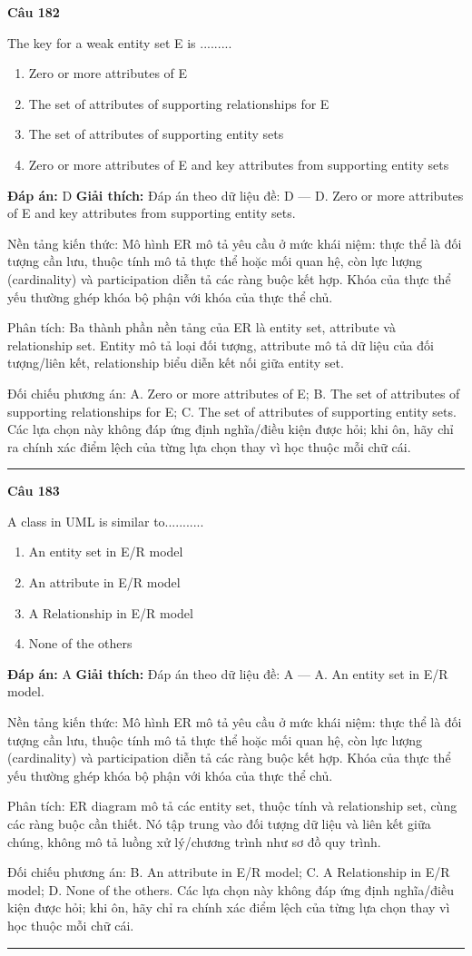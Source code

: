 \documentclass[11pt,a4paper]{article}
\newenvironment{question}[1]{%
  \par\vspace{1em}\noindent\textbf{\large Câu #1}\par\vspace{0.4em}
}{%
  \par\vspace{1em}\hrule\vspace{0.6em}
}
\newenvironment{choices}{%
  \begin{enumerate}[label=\textbf{\Alph*.},leftmargin=2.2em,itemsep=2pt,topsep=3pt]
}{%
  \end{enumerate}
}
\newcommand{\choice}{\item}
\begin{document}
\begin{question}{182}
The key for a weak entity set E is .........
\begin{choices}
\choice Zero or more attributes of E
\choice The set of attributes of supporting relationships for E
\choice The set of attributes of supporting entity sets
\choice Zero or more attributes of E and key attributes from supporting entity sets
\end{choices}
\textbf{Đáp án:} D
\textbf{Giải thích:} Đáp án theo dữ liệu đề: D — D. Zero or more attributes of E and key attributes from supporting entity sets.

Nền tảng kiến thức: Mô hình ER mô tả yêu cầu ở mức khái niệm: thực thể là đối tượng cần lưu, thuộc tính mô tả thực thể hoặc mối quan hệ, còn lực lượng (cardinality) và participation diễn tả các ràng buộc kết hợp. Khóa của thực thể yếu thường ghép khóa bộ phận với khóa của thực thể chủ.

Phân tích: Ba thành phần nền tảng của ER là entity set, attribute và relationship set. Entity mô tả loại đối tượng, attribute mô tả dữ liệu của đối tượng/liên kết, relationship biểu diễn kết nối giữa entity set.

Đối chiếu phương án: A. Zero or more attributes of E; B. The set of attributes of supporting relationships for E; C. The set of attributes of supporting entity sets. Các lựa chọn này không đáp ứng định nghĩa/điều kiện được hỏi; khi ôn, hãy chỉ ra chính xác điểm lệch của từng lựa chọn thay vì học thuộc mỗi chữ cái.
\end{question}

\begin{question}{183}
A class in UML is similar to...........
\begin{choices}
\choice An entity set in E/R model
\choice An attribute in E/R model
\choice A Relationship in E/R model
\choice None of the others
\end{choices}
\textbf{Đáp án:} A
\textbf{Giải thích:} Đáp án theo dữ liệu đề: A — A. An entity set in E/R model.

Nền tảng kiến thức: Mô hình ER mô tả yêu cầu ở mức khái niệm: thực thể là đối tượng cần lưu, thuộc tính mô tả thực thể hoặc mối quan hệ, còn lực lượng (cardinality) và participation diễn tả các ràng buộc kết hợp. Khóa của thực thể yếu thường ghép khóa bộ phận với khóa của thực thể chủ.

Phân tích: ER diagram mô tả các entity set, thuộc tính và relationship set, cùng các ràng buộc cần thiết. Nó tập trung vào đối tượng dữ liệu và liên kết giữa chúng, không mô tả luồng xử lý/chương trình như sơ đồ quy trình.

Đối chiếu phương án: B. An attribute in E/R model; C. A Relationship in E/R model; D. None of the others. Các lựa chọn này không đáp ứng định nghĩa/điều kiện được hỏi; khi ôn, hãy chỉ ra chính xác điểm lệch của từng lựa chọn thay vì học thuộc mỗi chữ cái.
\end{question}
\end{document}
